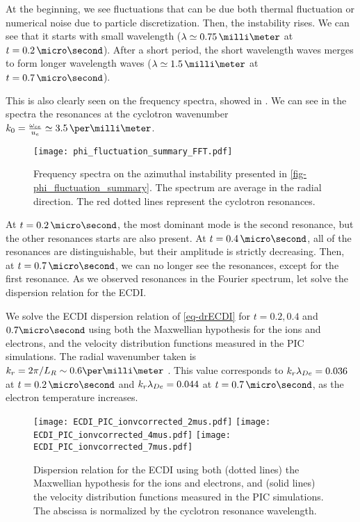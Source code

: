     At the beginning, we see fluctuations that can be due both thermal fluctuation \citep{salpeter1960} or numerical noise due to particle discretization.
    Then, the instability rises.
    We can see that it starts with small wavelength ($\lambda \simeq 0.75\,\milli\meter$ at $t=0.2\,\micro\second$).
    After a short period, the short wavelength waves merges to form longer wavelength waves  ($\lambda \simeq 1.5\,\milli\meter$ at $t=0.7\,\micro\second$).
    
    This is also clearly seen on the frequency spectra, showed in .
    We can see in the spectra the resonances at the cyclotron wavenumber $k_0 = \frac{\oce}{u_e} \simeq 3.5\,\per\milli\meter$.
    
    \begin{figure}[hbtp]
      \centering
      \texttt{[image: phi\_fluctuation\_summary\_FFT.pdf]}
      \caption{Frequency spectra on the azimuthal instability presented in \cref{fig-phi_fluctuation_summary}. The spectrum are average in the radial direction. The red dotted lines represent the cyclotron resonances.}
      \label{fig-phi_fluctuation_summary_FFT}
    \end{figure}
    
    At $t=0.2\,\micro\second$, the most dominant mode is the second resonance, but the other resonances starts are also present.
    At $t=0.4\,\micro\second$, all of the resonances are distinguishable, but their amplitude is strictly decreasing.
    Then, at $t=0.7\,\micro\second$, we can no longer see the resonances, except for the first resonance.
    As we observed resonances in the Fourier spectrum, let solve the dispersion relation for the \ac{ECDI}.
    
    \vspace{1em}
    We solve the \ac{ECDI} dispersion relation of \cref{eq-drECDI} for $t=0.2, 0.4$ and $0.7\micro\second$ using both the Maxwellian hypothesis for the ions and electrons, and the velocity distribution functions measured in the \ac{PIC} simulations.
    The radial wavenumber taken is $k_r = 2 \pi/L_R \sim 0.6 \per\milli\meter$ \citep{lafleur2016}.
    This value corresponds to $k_r \lambda_{De} = 0.036$ at $t=0.2\,\micro\second$ and $k_r \lambda_{De} = 0.044$ at $t=0.7\,\micro\second$, as the electron temperature increases.
    
    \begin{figure}[hbtp]
      \centering
        \texttt{[image: ECDI\_PIC\_ionvcorrected\_2mus.pdf]} 
        \texttt{[image: ECDI\_PIC\_ionvcorrected\_4mus.pdf]} 
        \texttt{[image: ECDI\_PIC\_ionvcorrected\_7mus.pdf]} 
      \caption{Dispersion relation for the \ac{ECDI} using both (dotted lines) the Maxwellian hypothesis for the ions and electrons, and (solid lines) the velocity distribution functions measured in the \ac{PIC} simulations. The abscissa is normalized by the cyclotron resonance wavelength.}
      \label{fig-DRECDI}
    \end{figure}
    
